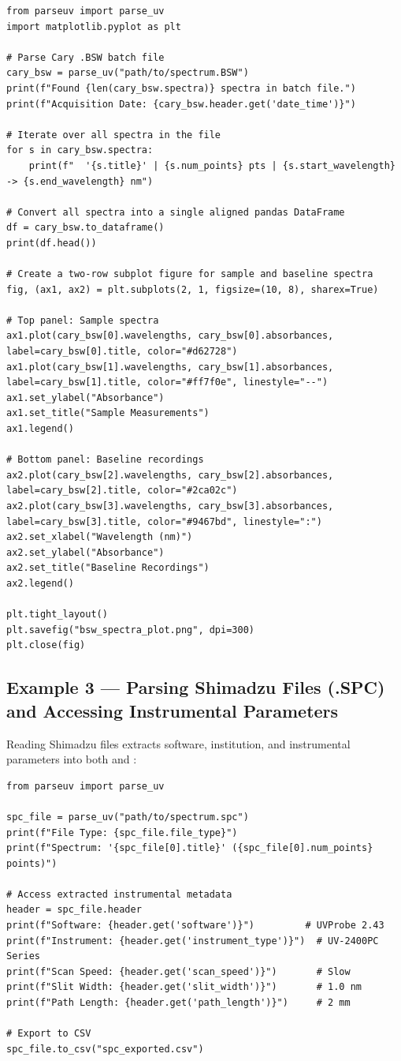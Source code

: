\documentclass[11pt,a4paper]{article}
\newcommand{\code}[1]{\texttt{\detokenize{#1}}}
\begin{document}
\begin{lstlisting}
from parseuv import parse_uv
import matplotlib.pyplot as plt

# Parse Cary .BSW batch file
cary_bsw = parse_uv("path/to/spectrum.BSW")
print(f"Found {len(cary_bsw.spectra)} spectra in batch file.")
print(f"Acquisition Date: {cary_bsw.header.get('date_time')}")

# Iterate over all spectra in the file
for s in cary_bsw.spectra:
    print(f"  '{s.title}' | {s.num_points} pts | {s.start_wavelength} -> {s.end_wavelength} nm")

# Convert all spectra into a single aligned pandas DataFrame
df = cary_bsw.to_dataframe()
print(df.head())

# Create a two-row subplot figure for sample and baseline spectra
fig, (ax1, ax2) = plt.subplots(2, 1, figsize=(10, 8), sharex=True)

# Top panel: Sample spectra
ax1.plot(cary_bsw[0].wavelengths, cary_bsw[0].absorbances, label=cary_bsw[0].title, color="#d62728")
ax1.plot(cary_bsw[1].wavelengths, cary_bsw[1].absorbances, label=cary_bsw[1].title, color="#ff7f0e", linestyle="--")
ax1.set_ylabel("Absorbance")
ax1.set_title("Sample Measurements")
ax1.legend()

# Bottom panel: Baseline recordings
ax2.plot(cary_bsw[2].wavelengths, cary_bsw[2].absorbances, label=cary_bsw[2].title, color="#2ca02c")
ax2.plot(cary_bsw[3].wavelengths, cary_bsw[3].absorbances, label=cary_bsw[3].title, color="#9467bd", linestyle=":")
ax2.set_xlabel("Wavelength (nm)")
ax2.set_ylabel("Absorbance")
ax2.set_title("Baseline Recordings")
ax2.legend()

plt.tight_layout()
plt.savefig("bsw_spectra_plot.png", dpi=300)
plt.close(fig)
\end{lstlisting}

\subsection{Example 3 — Parsing Shimadzu Files (.SPC) and Accessing Instrumental Parameters}

Reading Shimadzu \code{.SPC} files extracts software, institution, and instrumental parameters into both \code{header} and \code{metadata}:

\begin{lstlisting}
from parseuv import parse_uv

spc_file = parse_uv("path/to/spectrum.spc")
print(f"File Type: {spc_file.file_type}")
print(f"Spectrum: '{spc_file[0].title}' ({spc_file[0].num_points} points)")

# Access extracted instrumental metadata
header = spc_file.header
print(f"Software: {header.get('software')}")         # UVProbe 2.43
print(f"Instrument: {header.get('instrument_type')}")  # UV-2400PC Series
print(f"Scan Speed: {header.get('scan_speed')}")       # Slow
print(f"Slit Width: {header.get('slit_width')}")       # 1.0 nm
print(f"Path Length: {header.get('path_length')}")     # 2 mm

# Export to CSV
spc_file.to_csv("spc_exported.csv")
\end{lstlisting}
\end{document}
